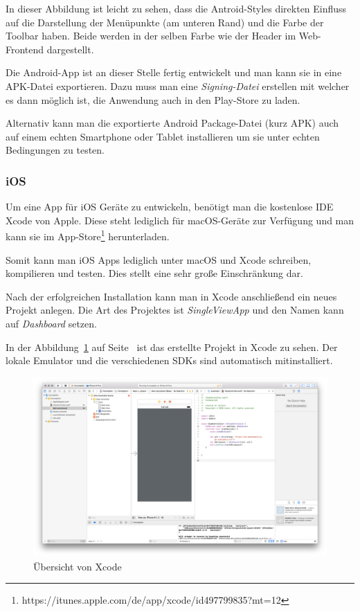 In dieser Abbildung ist leicht zu sehen, dass die Antroid-Styles direkten Einfluss auf die Darstellung der Menüpunkte
(am unteren Rand) und die Farbe der Toolbar haben. Beide werden in der selben Farbe wie der Header im Web-Frontend
dargestellt.

Die Android-App ist an dieser Stelle fertig entwickelt und man kann sie in eine APK-Datei exportieren. Dazu muss man
eine \textit{Signing-Datei} erstellen mit welcher es dann möglich ist, die Anwendung auch in den Play-Store zu laden.

Alternativ kann man die exportierte Android Package-Datei (kurz APK) auch auf einem echten Smartphone oder Tablet
installieren um sie unter echten Bedingungen zu testen.

\subsubsection{iOS}
Um eine App für iOS Geräte zu entwickeln, benötigt man die kostenlose IDE Xcode von Apple. Diese steht lediglich für
macOS-Geräte zur Verfügung und man kann sie im App-Store\footnote{https://itunes.apple.com/de/app/xcode/id497799835?mt=12}
herunterladen.

Somit kann man iOS Apps lediglich unter macOS und Xcode schreiben, kompilieren und testen. Dies stellt eine sehr große
Einschränkung dar.

Nach der erfolgreichen Installation kann man in Xcode anschließend ein neues Projekt anlegen. Die Art des Projektes ist
\textit{SingleViewApp} und den Namen kann auf \textit{Dashboard} setzen.

In der Abbildung~\ref{fig:umsetzung_ios_ide} auf Seite~\pageref{fig:umsetzung_ios_ide} ist das erstellte Projekt in
Xcode zu sehen. Der lokale Emulator und die verschiedenen SDKs sind automatisch mitinstalliert.

\begin{figure}[h]
    \centering
    \includegraphics[width=\textwidth]{images/kapitel_4/ios_ide.png}
    \caption{Übersicht von Xcode}
    \label{fig:umsetzung_ios_ide}
\end{figure}

